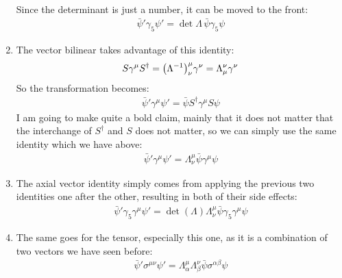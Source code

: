 \documentclass[12pt]{article}
\newcommand{\g}{\gamma}
\newcommand{\psib}{\bar{\psi}}
\begin{document}
\begin{enumerate}
\begin{align*}
  \end{align*}
  Since the determinant is just a number, it can be moved to the front:
  \begin{align*}
    \psib'\g_5\psi'=\det\Lambda\,\psib\g_5\psi
  \end{align*}
\item The vector bilinear takes advantage of this identity:
  \begin{align*}
    S\g^\mu S^\dag=\qty(\Lambda^{-1})^\mu_\nu\g^\nu=\Lambda^\nu_\mu\g^\nu
  \end{align*}
  So the transformation becomes:
  \begin{align*}
    \psib'\g^\mu\psi'=\psib S^\dag\g^\mu S\psi
  \end{align*}
  I am going to make quite a bold claim, mainly that it does not matter that the interchange of $S^\dag$ and $S$ does not matter, so we can simply use the same identity which we have above:
  \begin{align*}
    \psib'\g^\mu\psi'=\Lambda^\mu_\nu\psib\g^\mu\psi
  \end{align*}
\item The axial vector identity simply comes from applying the previous two identities one after the other, resulting in both of their side effects:
  \begin{align*}
    \psib'\g_5\g^\mu\psi'=\det(\Lambda)\Lambda^\mu_\nu\psib\g_5\g^\mu\psi
  \end{align*}
\item The same goes for the tensor, especially this one, as it is a combination of two vectors we have seen before:
  \begin{align*}
    \psib'\sigma^{\mu\nu}\psi'=\Lambda^\mu_\alpha\Lambda^\nu_\beta\psib
    \sigma^{\alpha\beta}\psi
  \end{align*}
\end{enumerate}
\end{document}
